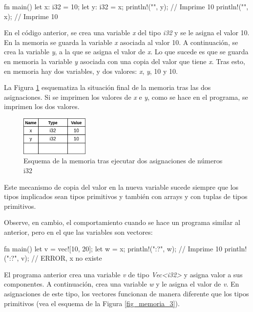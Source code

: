 \vspace{0.7em}
\begin{Codigo}
fn main() {
   let x: i32 = 10;
   let y: i32 = x;
   println!("{}", y); // Imprime 10
   println!("{}", x); // Imprime 10
}
\end{Codigo}

En el código anterior, se crea una variable \textit{x} del tipo \textit{i32} y se le asigna el valor 10. En la memoria se guarda la variable \textit{x} asociada al valor 10. A continuación, se crea la variable \textit{y}, a la que se asigna el valor de \textit{x}. Lo que sucede es que se guarda en memoria la variable \textit{y} asociada con una copia del valor que tiene \textit{x}. Tras esto, en memoria hay dos variables, y dos valores: \textit{x}, \textit{y}, 10 y 10. 

La Figura \ref{fig_memoria_2} esquematiza la situación final de la memoria tras las dos asignaciones. Si se imprimen los valores de \textit{x} e \textit{y}, como se hace en el programa, se imprimen los dos valores.

\begin{figure}[htb]
   \begin{center}
      \includegraphics[width=0.3\textwidth]{img/memoria_2.png}
      \caption{Esquema de la memoria tras ejecutar dos asignaciones de números i32}
      \label{fig_memoria_2}
   \end{center}
\end{figure}

Este mecanismo de copia del valor en la nueva variable sucede siempre que los tipos implicados sean tipos primitivos y también con arrays y con tuplas de tipos primitivos. 

Observe, en cambio, el comportamiento cuando se hace un programa similar al anterior, pero en el que las variables son vectores:

\vspace{0.7em}
\begin{Codigo}
fn main() {
   let v = vec![10, 20];
   let w = x;
   println!("{:?}", w); // Imprime 10
   println!("{:?}", v); // ERROR, x no existe
}
\end{Codigo}

El programa anterior crea una variable \textit{v} de tipo \textit{Vec<i32>} y asigna valor a sus componentes. A continuación, crea una variable \textit{w} y le asigna el valor de \textit{v}. En asignaciones de este tipo, los vectores funcionan de manera diferente que los tipos primitivos (vea el esquema de la Figura \ref{fig_memoria_3}). 


